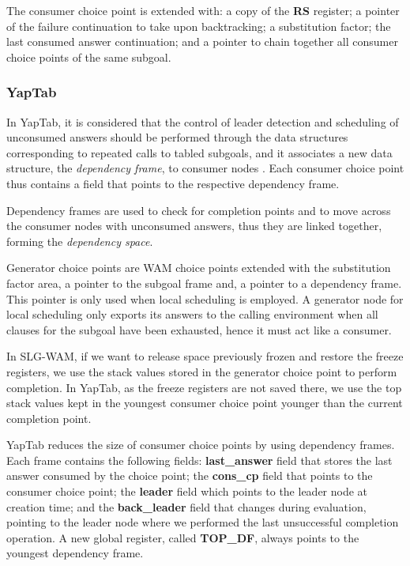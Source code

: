   The consumer choice point is extended with: a copy of the \textbf{RS} register; a pointer of the failure continuation to take
  upon backtracking; a substitution factor; the last consumed answer continuation; and a pointer to chain
  together all consumer choice points of the same subgoal. 

  \subsubsection{YapTab}

  In YapTab, it is considered that the control of leader detection and scheduling of unconsumed answers should be
  performed through the data structures corresponding to repeated calls to tabled subgoals, and it associates a new
  data structure, the \textit{dependency frame}, to consumer nodes \cite{Rocha-00a}. Each consumer choice point thus
  contains a field that points to the respective dependency frame.

  Dependency frames are used to check for completion points and to move across the consumer nodes with unconsumed answers,
  thus they are linked together, forming the \textit{dependency space}.

  Generator choice points are WAM choice points extended with the substitution factor area, a pointer
  to the subgoal frame and, a pointer to a dependency frame. This pointer
  is only used when local scheduling is employed. A generator node for local scheduling only exports its answers to the calling
  environment when all clauses for the subgoal have been exhausted, hence it must act like a consumer.

  In SLG-WAM, if we want to release space previously frozen and restore the freeze registers, we use the
  stack values stored in the generator choice point to perform completion. In YapTab, as the freeze registers
  are not saved there, we use the top stack values kept in the youngest consumer choice point younger than the current completion point.

  YapTab reduces the size of consumer choice points by using dependency frames. Each frame contains the
  following fields: \textbf{last\_answer} field that stores the last answer consumed by the choice point;
  the \textbf{cons\_cp} field that points to the consumer choice point; the \textbf{leader} field which
  points to the leader node at creation time; and the \textbf{back\_leader} field that changes during
  evaluation, pointing to the leader node where we performed the last unsuccessful completion operation.
  A new global register, called \textbf{TOP\_DF}, always points to the youngest dependency frame.